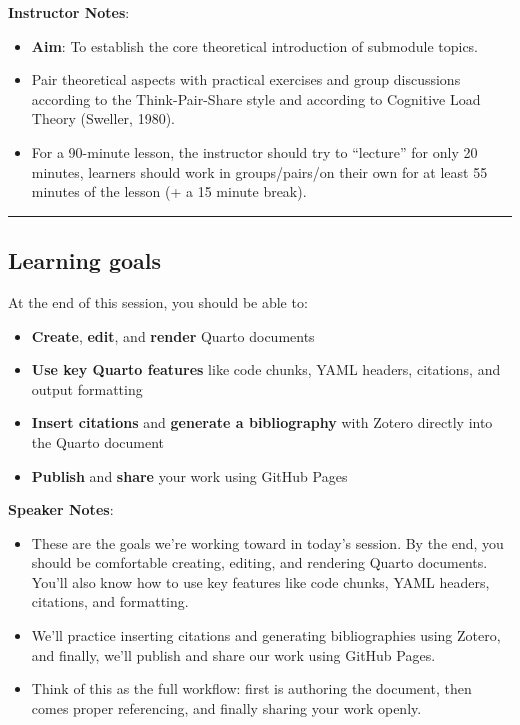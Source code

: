 \documentclass[
  letterpaper,
  DIV=11,
  numbers=noendperiod]{scrartcl}
\providecommand{\tightlist}{%
  \setlength{\itemsep}{0pt}\setlength{\parskip}{0pt}}
\begin{document}
\textbf{Instructor Notes}:

\begin{itemize}
\item
  \textbf{Aim}: To establish the core theoretical introduction of
  submodule topics.
\item
  Pair theoretical aspects with practical exercises and group
  discussions according to the Think-Pair-Share style and according to
  Cognitive Load Theory (Sweller, 1980).
\item
  For a 90-minute lesson, the instructor should try to ``lecture'' for
  only 20 minutes, learners should work in groups/pairs/on their own for
  at least 55 minutes of the lesson (+ a 15 minute break).
\end{itemize}

\begin{center}\rule{0.5\linewidth}{0.5pt}\end{center}

\subsection{Learning goals}\label{learning-goals}

At the end of this session, you should be able to:

\begin{itemize}
\tightlist
\item
  \textbf{Create}, \textbf{edit}, and \textbf{render} Quarto documents
\item
  \textbf{Use key Quarto features} like code chunks, YAML headers,
  citations, and output formatting
\item
  \textbf{Insert citations} and \textbf{generate a bibliography} with
  Zotero directly into the Quarto document
\item
  \textbf{Publish} and \textbf{share} your work using GitHub Pages
\end{itemize}

\textbf{Speaker Notes}:

\begin{itemize}
\item
  These are the goals we're working toward in today's session. By the
  end, you should be comfortable creating, editing, and rendering Quarto
  documents. You'll also know how to use key features like code chunks,
  YAML headers, citations, and formatting.
\item
  We'll practice inserting citations and generating bibliographies using
  Zotero, and finally, we'll publish and share our work using GitHub
  Pages.
\item
  Think of this as the full workflow: first is authoring the document,
  then comes proper referencing, and finally sharing your work openly.
\end{itemize}
\end{document}
